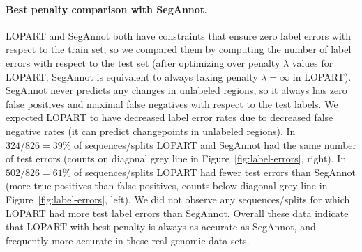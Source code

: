 \documentclass[12pt]{article}
\begin{document}



\paragraph{Best penalty comparison with SegAnnot.} LOPART and SegAnnot both have constraints that ensure zero label errors with respect to the train set, so we compared them by computing the number of label errors with respect to the test set (after optimizing over penalty $\lambda$ values for LOPART; SegAnnot is equivalent to always taking penalty $\lambda=\infty$ in LOPART).
SegAnnot never predicts any changes in unlabeled regions, so it always has zero false positives and maximal false negatives with respect to the test labels.
We expected LOPART to have decreased label error rates due to decreased false negative rates (it can predict changepoints in unlabeled regions).
In $324/826=39\%$ of sequences/splits LOPART and SegAnnot had the same number of test errors (counts on diagonal grey line in Figure~\ref{fig:label-errors}, right).
In $502/826=61\%$ of sequences/splits LOPART had fewer test errors than SegAnnot (more true positives than false positives, counts below diagonal grey line in Figure~\ref{fig:label-errors}, left).
We did not observe any sequences/splits for which LOPART had more test label errors than SegAnnot.
Overall these data indicate that LOPART with best penalty is always as accurate as SegAnnot, and frequently more accurate in these real genomic data sets.
\end{document}
